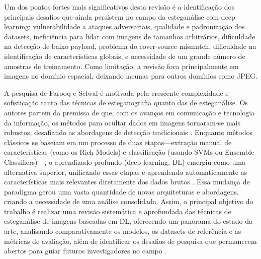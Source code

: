 \documentclass[12pt]{article}
\begin{document}
Um dos pontos fortes mais significativos desta revisão é a identificação dos
principais desafios que ainda persistem no campo da esteganálise com deep
learning: vulnerabilidade a ataques adversariais, qualidade e padronização dos
datasets, ineficiência para lidar com imagens de tamanhos arbitrários,
dificuldade na detecção de baixo payload, problema do cover-source mismatch,
dificuldade na identificação de características globais, e necessidade de um
grande número de amostras de treinamento. Como limitação, a revisão foca
principalmente em imagens no domínio espacial, deixando lacunas para outros
domínios como JPEG. 

A pesquisa de Farooq e Selwal \cite{farooq2023systematic} é motivada pela crescente complexidade e sofisticação tanto das técnicas de esteganografia quanto das de esteganálise. Os autores partem da premissa de que, com os avanços em comunicação e tecnologia da informação, os métodos para ocultar dados em imagens tornaram-se mais robustos, desafiando as abordagens de detecção tradicionais \cite{farooq2023systematic}. Enquanto métodos clássicos se baseiam em um processo de duas etapas—extração manual de características (como os Rich Models) e classificação (usando SVMs ou Ensemble Classifiers)—, o aprendizado profundo (deep learning, DL) emergiu como uma alternativa superior, unificando essas etapas e aprendendo automaticamente as características mais relevantes diretamente dos dados brutos \cite{farooq2023systematic}. Essa mudança de paradigma gerou uma vasta quantidade de novas arquiteturas e abordagens, criando a necessidade de uma análise consolidada. Assim, o principal objetivo do trabalho é realizar uma revisão sistemática e aprofundada das técnicas de esteganálise de imagens baseadas em DL, oferecendo um panorama do estado da arte, analisando comparativamente os modelos, os datasets de referência e as métricas de avaliação, além de identificar os desafios de pesquisa que permanecem abertos para guiar futuros investigadores no campo \cite{farooq2023systematic}.
\end{document}
